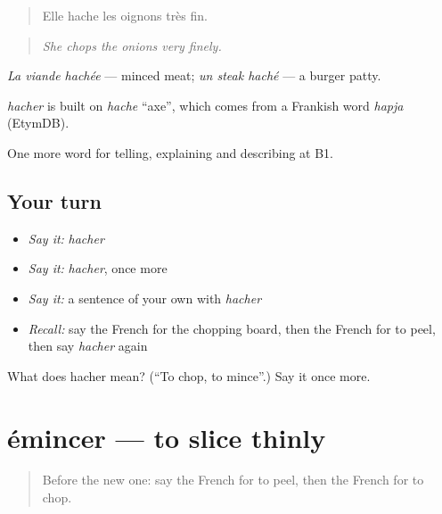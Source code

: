 \begin{quote}
Elle hache les oignons très fin.
\end{quote}

\begin{quote}
\emph{She chops the onions very finely.}
\end{quote}

\emph{La viande hachée} — minced meat; \emph{un steak haché} — a burger patty.

\begin{cousinweb}
\emph{hacher} is built on \emph{hache} \textquotedblleft{}axe\textquotedblright{}, which comes from a Frankish word \emph{hapja} (EtymDB).
\end{cousinweb}

\begin{grammarlens}[title={What you've built}]
One more word for telling, explaining and describing at B1.
\end{grammarlens}

\subsection*{Your turn}
\begin{itemize}
\raggedright
  \item \emph{Say it:} \emph{hacher}
  \item \emph{Say it:} \emph{hacher}, once more
  \item \emph{Say it:} a sentence of your own with \emph{hacher}
  \item \emph{Recall:} say the French for the chopping board, then the French for to peel, then say \emph{hacher} again
\end{itemize}

\begin{tcolorbox}[breakable,colback=teal!4,colframe=teal!35!black,title={Before you move on}]
What does hacher mean? (\textquotedblleft{}To chop, to mince\textquotedblright{}.) Say it once more.
\end{tcolorbox}
\section[émincer]{émincer — to slice thinly}

\label{lesson:FR-C328-emincer}



\begin{quote}
Before the new one: say the French for to peel, then the French for to chop.
\end{quote}

